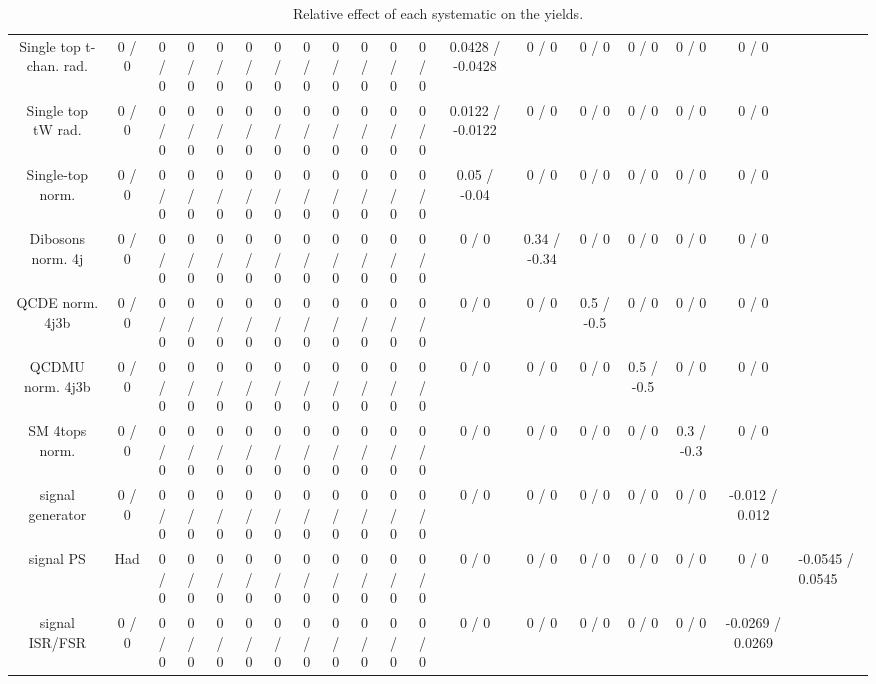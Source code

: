 \documentclass[10pt]{article}
\begin{document}
\begin{table}[htbp]
\begin{center}
\begin{tabular}{|c|c|c|c|c|c|c|c|c|c|c|c|c|c|c|c|c|c|}
  Single top t-chan. rad. & 0 / 0 & 0 / 0 & 0 / 0 & 0 / 0 & 0 / 0 & 0 / 0 & 0 / 0 & 0 / 0 & 0 / 0 & 0 / 0 & 0 / 0 & 0.0428 / -0.0428 & 0 / 0 & 0 / 0 & 0 / 0 & 0 / 0 & 0 / 0 \\ 
  Single top tW rad. & 0 / 0 & 0 / 0 & 0 / 0 & 0 / 0 & 0 / 0 & 0 / 0 & 0 / 0 & 0 / 0 & 0 / 0 & 0 / 0 & 0 / 0 & 0.0122 / -0.0122 & 0 / 0 & 0 / 0 & 0 / 0 & 0 / 0 & 0 / 0 \\ 
  Single-top norm. & 0 / 0 & 0 / 0 & 0 / 0 & 0 / 0 & 0 / 0 & 0 / 0 & 0 / 0 & 0 / 0 & 0 / 0 & 0 / 0 & 0 / 0 & 0.05 / -0.04 & 0 / 0 & 0 / 0 & 0 / 0 & 0 / 0 & 0 / 0 \\ 
  Dibosons norm. 4j & 0 / 0 & 0 / 0 & 0 / 0 & 0 / 0 & 0 / 0 & 0 / 0 & 0 / 0 & 0 / 0 & 0 / 0 & 0 / 0 & 0 / 0 & 0 / 0 & 0.34 / -0.34 & 0 / 0 & 0 / 0 & 0 / 0 & 0 / 0 \\ 
  QCDE norm. 4j3b & 0 / 0 & 0 / 0 & 0 / 0 & 0 / 0 & 0 / 0 & 0 / 0 & 0 / 0 & 0 / 0 & 0 / 0 & 0 / 0 & 0 / 0 & 0 / 0 & 0 / 0 & 0.5 / -0.5 & 0 / 0 & 0 / 0 & 0 / 0 \\ 
  QCDMU norm. 4j3b & 0 / 0 & 0 / 0 & 0 / 0 & 0 / 0 & 0 / 0 & 0 / 0 & 0 / 0 & 0 / 0 & 0 / 0 & 0 / 0 & 0 / 0 & 0 / 0 & 0 / 0 & 0 / 0 & 0.5 / -0.5 & 0 / 0 & 0 / 0 \\ 
  SM 4tops norm. & 0 / 0 & 0 / 0 & 0 / 0 & 0 / 0 & 0 / 0 & 0 / 0 & 0 / 0 & 0 / 0 & 0 / 0 & 0 / 0 & 0 / 0 & 0 / 0 & 0 / 0 & 0 / 0 & 0 / 0 & 0.3 / -0.3 & 0 / 0 \\ 
  signal generator & 0 / 0 & 0 / 0 & 0 / 0 & 0 / 0 & 0 / 0 & 0 / 0 & 0 / 0 & 0 / 0 & 0 / 0 & 0 / 0 & 0 / 0 & 0 / 0 & 0 / 0 & 0 / 0 & 0 / 0 & 0 / 0 & -0.012 / 0.012 \\ 
  signal PS & Had & 0 / 0 & 0 / 0 & 0 / 0 & 0 / 0 & 0 / 0 & 0 / 0 & 0 / 0 & 0 / 0 & 0 / 0 & 0 / 0 & 0 / 0 & 0 / 0 & 0 / 0 & 0 / 0 & 0 / 0 & 0 / 0 & -0.0545 / 0.0545 \\ 
  signal ISR/FSR & 0 / 0 & 0 / 0 & 0 / 0 & 0 / 0 & 0 / 0 & 0 / 0 & 0 / 0 & 0 / 0 & 0 / 0 & 0 / 0 & 0 / 0 & 0 / 0 & 0 / 0 & 0 / 0 & 0 / 0 & 0 / 0 & -0.0269 / 0.0269 \\ 
\hline 
\end{tabular} 
\caption{Relative effect of each systematic on the yields.} 
\end{center} 
\end{table} 
\end{document}
